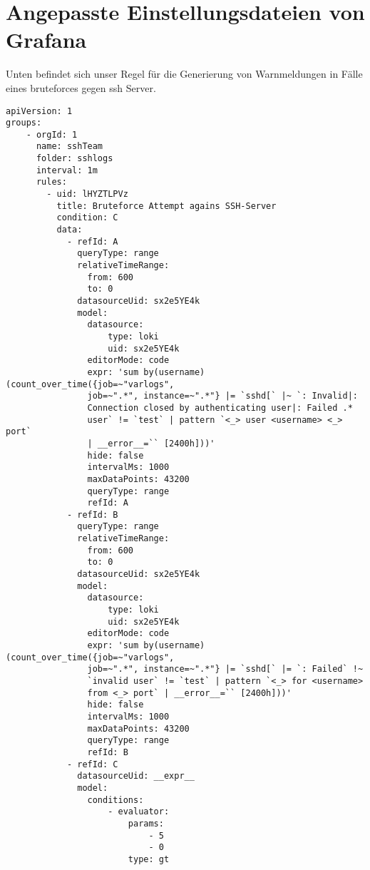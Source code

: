 \section{Angepasste Einstellungsdateien von Grafana}\label{appendix:Warnmedungskonfiguration}

Unten befindet sich unser Regel für die Generierung von Warnmeldungen in Fälle eines \gls{bruteforce}s gegen \gls{ssh} Server.

{
\begin{Verbatim}[frame=single]
apiVersion: 1
groups:
    - orgId: 1
      name: sshTeam
      folder: sshlogs
      interval: 1m
      rules:
        - uid: lHYZTLPVz
          title: Bruteforce Attempt agains SSH-Server
          condition: C
          data:
            - refId: A
              queryType: range
              relativeTimeRange:
                from: 600
                to: 0
              datasourceUid: sx2e5YE4k
              model:
                datasource:
                    type: loki
                    uid: sx2e5YE4k
                editorMode: code
                expr: 'sum by(username) (count_over_time({job=~"varlogs", 
                job=~".*", instance=~".*"} |= `sshd[` |~ `: Invalid|: 
                Connection closed by authenticating user|: Failed .* 
                user` != `test` | pattern `<_> user <username> <_> port`
                | __error__=`` [2400h]))'
                hide: false
                intervalMs: 1000
                maxDataPoints: 43200
                queryType: range
                refId: A
            - refId: B
              queryType: range
              relativeTimeRange:
                from: 600
                to: 0
              datasourceUid: sx2e5YE4k
              model:
                datasource:
                    type: loki
                    uid: sx2e5YE4k
                editorMode: code
                expr: 'sum by(username) (count_over_time({job=~"varlogs", 
                job=~".*", instance=~".*"} |= `sshd[` |= `: Failed` !~ 
                `invalid user` != `test` | pattern `<_> for <username> 
                from <_> port` | __error__=`` [2400h]))'
                hide: false
                intervalMs: 1000
                maxDataPoints: 43200
                queryType: range
                refId: B
            - refId: C
              datasourceUid: __expr__
              model:
                conditions:
                    - evaluator:
                        params:
                            - 5
                            - 0
                        type: gt

\end{Verbatim}}

